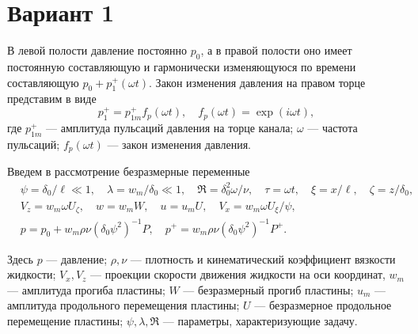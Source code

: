 \documentclass{article}
\begin{document}
\section*{Вариант 1}
В левой полости давление постоянно \(p_0\), а в правой полости оно имеет постоянную составляющую и гармонически изменяющуюся по времени составляющую \(p_0 + p_1^+(\omega t)\). Закон изменения давления на правом торце представим в виде
\begin{equation}
	p_1^+ = p_{1m}^+ f_p(\omega t), \quad f_p(\omega t) = \exp(i\omega t),
\end{equation}
где \(p_{1m}^+\) --- амплитуда пульсаций давления на торце канала; \(\omega\) --- частота пульсаций; \(f_p(\omega t)\) --- закон изменения давления.

Введем в рассмотрение безразмерные переменные
\begin{equation}
	\begin{aligned}
		&\psi = \delta_0 / \ell \ll 1, \quad \lambda = w_m / \delta_0 \ll 1, \quad \Re = \delta_0^2 \omega / \nu, \quad \tau = \omega t, \quad \xi = x / \ell, \quad \zeta = z / \delta_0,\\
		&V_z = w_m \omega U_\zeta, \quad w = w_m W, \quad u = u_m U, \quad V_x = w_m \omega U_\xi / \psi,\\
		&p = p_0 + w_m \rho \nu (\delta_0 \psi^2)^{-1} P, \quad p^+ = w_m \rho \nu (\delta_0 \psi^2)^{-1} P^+.
	\end{aligned}
\end{equation}

Здесь \(p\) --- давление; \(\rho, \nu\) --- плотность и кинематический коэффициент вязкости жидкости; \(V_x, V_z\) --- проекции скорости движения жидкости на оси координат, \(w_m\) --- амплитуда прогиба пластины; \(W\) --- безразмерный прогиб пластины; \(u_m\) --- амплитуда продольного перемещения пластины; \(U\) --- безразмерное продольное перемещение пластины; \(\psi, \lambda, \Re\) --- параметры, характеризующие задачу.
\end{document}
